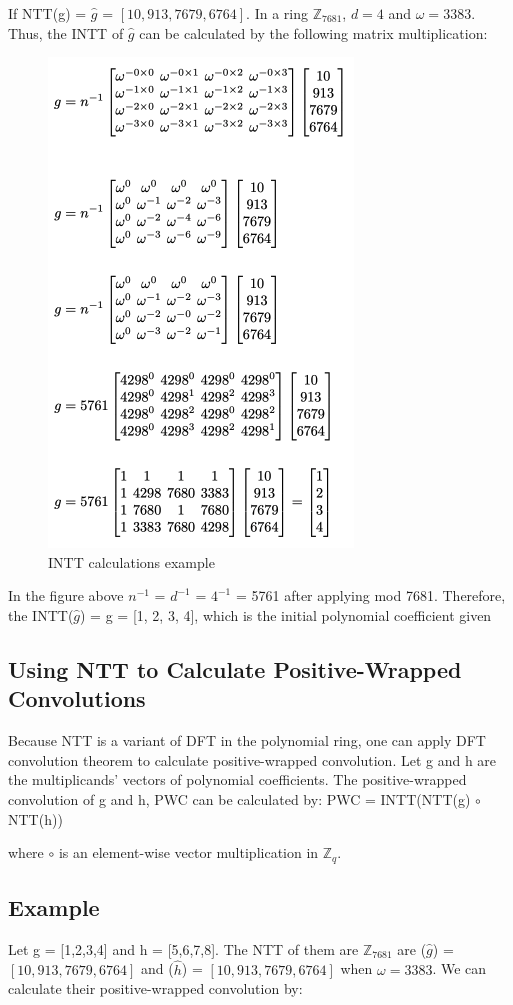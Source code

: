 \documentclass{techrep}
\theoremstyle{definition}
\theoremstyle{plain}
\newcommand{\Z}{\mathbb{Z}}
\begin{document}
If NTT(g) = $\hat{g}$ = $[10, 913, 7679, 6764]$. In a ring $\Z_{7681}$, $d = 4$ and $\omega =3383$. Thus, the INTT of $\hat{g}$ can be calculated by the following matrix multiplication:


\begin{figure}[H]
 	\centering
 	\includegraphics[width=.4\columnwidth]{fig/INTT_cal.png}
 	\caption{INTT calculations example} 
\label{fig:INTT_cal}
\end{figure}

In the figure above $n^{-1}$ = $d^{-1}$ = $4^{-1}$ = 5761 after applying mod 7681. Therefore, the INTT($\hat{g}$) = g = [1, 2, 3, 4], which is the initial polynomial coefficient given  

\subsection{Using NTT to Calculate Positive-Wrapped Convolutions}

Because NTT is a variant of DFT in the polynomial ring, one can apply DFT convolution theorem to calculate positive-wrapped convolution. Let g and h are the multiplicands’ vectors of polynomial coefficients. The positive-wrapped convolution of g and h, PWC can be calculated by:
PWC = INTT(NTT(g) $\circ$ NTT(h))

where $\circ$ is an element-wise vector multiplication in $\Z_{q}$.

\subsection{Example}
Let g = [1,2,3,4] and h = [5,6,7,8]. The NTT of them are $\Z_{7681}$ are ($\hat{g}$) = $[10, 913, 7679, 6764]$ and ($\hat{h}$) = $[10, 913, 7679, 6764]$ when $\omega =3383$. We can calculate their positive-wrapped convolution by:
\end{document}
